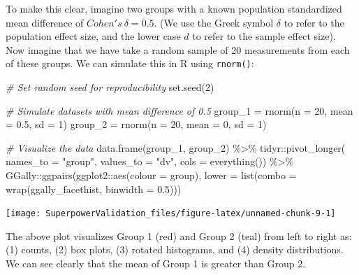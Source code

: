 \documentclass[
]{book}
\newenvironment{Shaded}{\begin{snugshade}}{\end{snugshade}}
\newcommand{\AttributeTok}[1]{\textcolor[rgb]{0.77,0.63,0.00}{#1}}
\newcommand{\CommentTok}[1]{\textcolor[rgb]{0.56,0.35,0.01}{\textit{#1}}}
\newcommand{\DecValTok}[1]{\textcolor[rgb]{0.00,0.00,0.81}{#1}}
\newcommand{\FloatTok}[1]{\textcolor[rgb]{0.00,0.00,0.81}{#1}}
\newcommand{\FunctionTok}[1]{\textcolor[rgb]{0.00,0.00,0.00}{#1}}
\newcommand{\NormalTok}[1]{#1}
\newcommand{\OtherTok}[1]{\textcolor[rgb]{0.56,0.35,0.01}{#1}}
\newcommand{\SpecialCharTok}[1]{\textcolor[rgb]{0.00,0.00,0.00}{#1}}
\newcommand{\StringTok}[1]{\textcolor[rgb]{0.31,0.60,0.02}{#1}}
\begin{document}
To make this clear, imagine two groups with a known population standardized mean difference of \(Cohen's \ \delta = 0.5\). (We use the Greek symbol \(\delta\) to refer to the population effect size, and the lower case \(d\) to refer to the sample effect size). Now imagine that we have take a random sample of 20 measurements from each of these groups. We can simulate this in R using \texttt{rnorm()}:

\begin{Shaded}
\begin{Highlighting}[]
\CommentTok{\# Set random seed for reproducibility}
\FunctionTok{set.seed}\NormalTok{(}\DecValTok{2}\NormalTok{)}

\CommentTok{\# Simulate datasets with mean difference of 0.5}
\NormalTok{group\_1 }\OtherTok{=} \FunctionTok{rnorm}\NormalTok{(}\AttributeTok{n =} \DecValTok{20}\NormalTok{, }\AttributeTok{mean =} \FloatTok{0.5}\NormalTok{, }\AttributeTok{sd =} \DecValTok{1}\NormalTok{)}
\NormalTok{group\_2 }\OtherTok{=} \FunctionTok{rnorm}\NormalTok{(}\AttributeTok{n =} \DecValTok{20}\NormalTok{, }\AttributeTok{mean =} \DecValTok{0}\NormalTok{, }\AttributeTok{sd =} \DecValTok{1}\NormalTok{)}

\CommentTok{\# Visualize the data}
\FunctionTok{data.frame}\NormalTok{(group\_1, group\_2) }\SpecialCharTok{\%\textgreater{}\%} 
\NormalTok{  tidyr}\SpecialCharTok{::}\FunctionTok{pivot\_longer}\NormalTok{(}
    \AttributeTok{names\_to =} \StringTok{"group"}\NormalTok{, }
    \AttributeTok{values\_to =} \StringTok{"dv"}\NormalTok{, }
    \AttributeTok{cols =} \FunctionTok{everything}\NormalTok{()) }\SpecialCharTok{\%\textgreater{}\%} 
\NormalTok{  GGally}\SpecialCharTok{::}\FunctionTok{ggpairs}\NormalTok{(ggplot2}\SpecialCharTok{::}\FunctionTok{aes}\NormalTok{(}\AttributeTok{colour =}\NormalTok{ group), }
                  \AttributeTok{lower =} \FunctionTok{list}\NormalTok{(}\AttributeTok{combo =} \FunctionTok{wrap}\NormalTok{(ggally\_facethist, }
                                            \AttributeTok{binwidth =} \FloatTok{0.5}\NormalTok{)))}
\end{Highlighting}
\end{Shaded}

\texttt{[image: SuperpowerValidation\_files/figure-latex/unnamed-chunk-9-1]}

The above plot visualizes Group 1 (red) and Group 2 (teal) from left to right as: (1) counts, (2) box plots, (3) rotated histograms, and (4) density distributions. We can see clearly that the mean of Group 1 is greater than Group 2.
\end{document}
